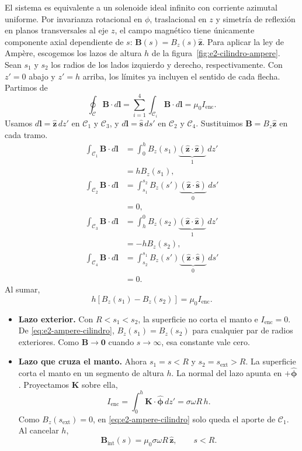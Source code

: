 \documentclass[11pt]{article}
\begin{document}
El sistema es equivalente a un solenoide ideal infinito con corriente azimutal uniforme. Por invarianza rotacional en $\phi$, traslacional en $z$ y simetría de reflexión en planos transversales al eje $z$, el campo magnético tiene únicamente componente axial dependiente de $s$: $\mathbf{B}(s) = B_z(s) \hat{\mathbf{z}}$.
Para aplicar la ley de Ampère, escogemos los lazos de altura $h$
de la figura~\ref{fig:e2-cilindro-ampere}. Sean $s_1$ y $s_2$
los radios de los lados izquierdo y derecho, respectivamente.
Con $z'=0$ abajo y $z'=h$ arriba, los límites ya incluyen el sentido
de cada flecha. Partimos de
\[
    \oint_{\mathcal C}\mathbf B\cdot d\mathbf l
    =\sum_{i=1}^4\int_{\mathcal C_i}\mathbf B\cdot d\mathbf l
    =\mu_0 I_{\mathrm{enc}}.
\]
Usamos $d\mathbf l=\hat{\mathbf z}\,dz'$ en $\mathcal C_1$ y
$\mathcal C_3$, y $d\mathbf l=\hat{\mathbf s}\,ds'$ en $\mathcal C_2$
y $\mathcal C_4$. Sustituimos $\mathbf B=B_z\hat{\mathbf z}$ en
cada tramo.
\begin{align*}
    \int_{\mathcal C_1}\mathbf B\cdot d\mathbf l
    &=\int_0^h B_z(s_1)
          \underbrace{(\hat{\mathbf z}\cdot\hat{\mathbf z})}_{1}\,dz'\\
    &=hB_z(s_1),\\[4pt]
    \int_{\mathcal C_2}\mathbf B\cdot d\mathbf l
    &=\int_{s_1}^{s_2} B_z(s')
          \underbrace{(\hat{\mathbf z}\cdot\hat{\mathbf s})}_{0}\,ds'\\
    &=0,\\[4pt]
    \int_{\mathcal C_3}\mathbf B\cdot d\mathbf l
    &=\int_h^0 B_z(s_2)
          \underbrace{(\hat{\mathbf z}\cdot\hat{\mathbf z})}_{1}\,dz'\\
    &=-hB_z(s_2),\\[4pt]
    \int_{\mathcal C_4}\mathbf B\cdot d\mathbf l
    &=\int_{s_2}^{s_1} B_z(s')
          \underbrace{(\hat{\mathbf z}\cdot\hat{\mathbf s})}_{0}\,ds'\\
    &=0.
\end{align*}
Al sumar,
\begin{equation}
    h[B_z(s_1)-B_z(s_2)]=\mu_0 I_{\mathrm{enc}}.
    \label{eq:e2-ampere-cilindro}
\end{equation}
\begin{itemize}
    \item \textbf{Lazo exterior.} Con $R<s_1<s_2$, la superficie no
    corta el manto e $I_{\mathrm{enc}}=0$. De
    \eqref{eq:e2-ampere-cilindro}, $B_z(s_1)=B_z(s_2)$ para cualquier
    par de radios exteriores. Como $\mathbf B\to\mathbf0$ cuando
    $s\to\infty$, esa constante vale cero.
    \item \textbf{Lazo que cruza el manto.} Ahora $s_1=s<R$ y
    $s_2=s_{\mathrm{ext}}>R$. La superficie corta el manto en un
    segmento de altura $h$. La normal del lazo apunta en
    $+\hat{\boldsymbol\phi}$. Proyectamos $\mathbf K$ sobre ella,
    \[
        I_{\mathrm{enc}}
        =\int_0^h\mathbf K\cdot\hat{\boldsymbol\phi}\,dz'
        =\sigma\omega R\,h.
    \]
    Como $B_z(s_{\mathrm{ext}})=0$, en \eqref{eq:e2-ampere-cilindro}
    solo queda el aporte de $\mathcal C_1$. Al cancelar $h$,
    \[
        \mathbf B_{\mathrm{int}}(s)
        =\mu_0\sigma\omega R\,\hat{\mathbf z},
        \qquad s<R.
    \]
\end{itemize}
\end{document}
